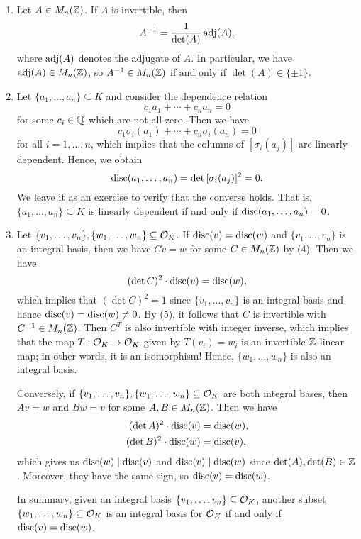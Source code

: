 \begin{enumerate}[(1)]
    \item Let $A \in M_n(\mathbb{Z})$. If $A$ is invertible, then 
    \[ A^{-1} = \frac{1}{\det(A)} \operatorname{adj}(A), \] 
    where $\operatorname{adj}(A)$ denotes the adjugate of $A$. In particular, we have 
    $\operatorname{adj}(A) \in M_n(\mathbb{Z})$, so $A^{-1} \in M_n(\mathbb{Z})$ if and only if 
    $\det(A) \in \{\pm1\}$. 

    \item Let $\{a_1, \dots, a_n\} \subseteq K$ and consider the dependence 
    relation 
    \[ c_1 a_1 + \cdots + c_n a_n = 0 \] 
    for some $c_i \in \mathbb{Q}$ which are not all zero. Then we have 
    \[ c_1 \sigma_i(a_1) + \cdots + c_n \sigma_i(a_n) = 0 \] 
    for all $i = 1, \dots, n$, which implies that the columns of 
    $[\sigma_i(a_j)]$ are linearly dependent. Hence, we obtain 
    \[ \operatorname{disc}(a_1, \dots, a_n) = \det\,[\sigma_i(a_j)]^2 = 0. \] 
    We leave it as an exercise to verify that the converse holds. 
    That is, $\{a_1, \dots, a_n\} \subseteq K$ is linearly dependent 
    if and only if $\operatorname{disc}(a_1, \dots, a_n) = 0$. 
    
    \item Let $\{v_1, \dots, v_n\}, \{w_1, \dots, w_n\} \subseteq {\cal O}_K$. 
    If $\operatorname{disc}(v) = \operatorname{disc}(w)$ and $\{v_1, \dots, v_n\}$ is an integral 
    basis, then we have $Cv = w$ for some $C \in M_n(\mathbb{Z})$ by (4). Then we have 
    \[ (\det C)^2 \cdot \operatorname{disc}(v) = \operatorname{disc}(w), \] 
    which implies that $(\det C)^2 = 1$ since $\{v_1, \dots, v_n\}$ 
    is an integral basis and hence $\operatorname{disc}(v) = \operatorname{disc}(w) \neq 0$. By (5),
    it follows that $C$ is invertible with $C^{-1} \in M_n(\mathbb{Z})$. 
    Then $C^T$ is also invertible with integer inverse, which implies that 
    the map $T : {\cal O}_K \to {\cal O}_K$ given by $T(v_i) = w_i$ is 
    an invertible $\mathbb{Z}$-linear map; in other words, it is an isomorphism! 
    Hence, $\{w_1, \dots, w_n\}$ is also an integral basis. 

    Conversely, if $\{v_1, \dots, v_n\}, \{w_1, \dots, w_n\} \subseteq 
    {\cal O}_K$ are both integral bases, then $Av = w$ and $Bw = v$ for some 
    $A, B \in M_n(\mathbb{Z})$. Then we have 
    \begin{align*}
        (\det A)^2 \cdot \operatorname{disc}(v) &= \operatorname{disc}(w), \\ 
        (\det B)^2 \cdot \operatorname{disc}(w) &= \operatorname{disc}(v), 
    \end{align*}
    which gives us $\operatorname{disc}(w) \mid \operatorname{disc}(v)$ and $\operatorname{disc}(v) \mid \operatorname{disc}(w)$ 
    since $\det(A), \det(B) \in \mathbb{Z}$. Moreover, they have the same sign, 
    so $\operatorname{disc}(v) = \operatorname{disc}(w)$. 

    In summary, given an integral basis $\{v_1, \dots, v_n\} \subseteq 
    {\cal O}_K$, another subset $\{w_1, \dots, w_n\} \subseteq {\cal O}_K$ 
    is an integral basis for ${\cal O}_K$ if and only if $\operatorname{disc}(v) = \operatorname{disc}(w)$. 
\end{enumerate}

